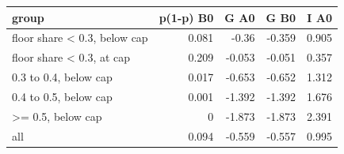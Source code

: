 \begin{tabular}{lrrrr}
\toprule
group & p(1-p) B0 & G A0 & G B0 & I A0 \\
\midrule
floor share < 0.3, below cap & 0.081 & -0.36 & -0.359 & 0.905 \\
floor share < 0.3, at cap & 0.209 & -0.053 & -0.051 & 0.357 \\
0.3 to 0.4, below cap & 0.017 & -0.653 & -0.652 & 1.312 \\
0.4 to 0.5, below cap & 0.001 & -1.392 & -1.392 & 1.676 \\
>= 0.5, below cap & 0 & -1.873 & -1.873 & 2.391 \\
all & 0.094 & -0.559 & -0.557 & 0.995 \\
\bottomrule
\end{tabular}
